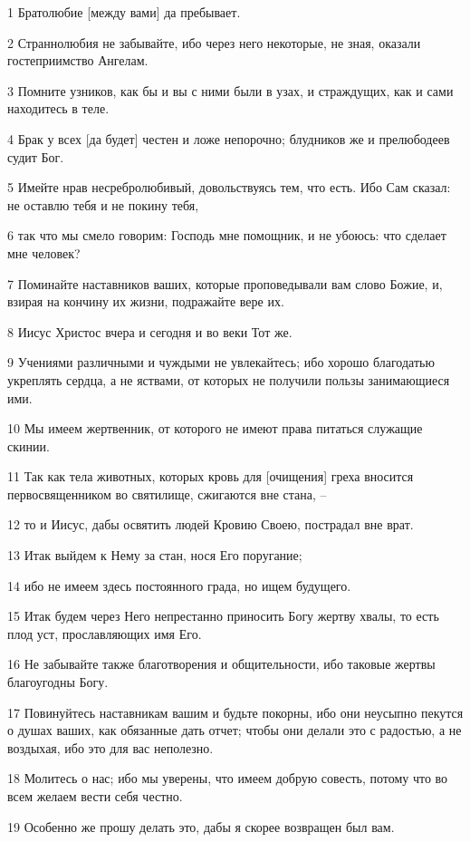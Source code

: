 \par 1 Братолюбие [между вами] да пребывает.
\par 2 Страннолюбия не забывайте, ибо через него некоторые, не зная, оказали гостеприимство Ангелам.
\par 3 Помните узников, как бы и вы с ними были в узах, и страждущих, как и сами находитесь в теле.
\par 4 Брак у всех [да будет] честен и ложе непорочно; блудников же и прелюбодеев судит Бог.
\par 5 Имейте нрав несребролюбивый, довольствуясь тем, что есть. Ибо Сам сказал: не оставлю тебя и не покину тебя,
\par 6 так что мы смело говорим: Господь мне помощник, и не убоюсь: что сделает мне человек?
\par 7 Поминайте наставников ваших, которые проповедывали вам слово Божие, и, взирая на кончину их жизни, подражайте вере их.
\par 8 Иисус Христос вчера и сегодня и во веки Тот же.
\par 9 Учениями различными и чуждыми не увлекайтесь; ибо хорошо благодатью укреплять сердца, а не яствами, от которых не получили пользы занимающиеся ими.
\par 10 Мы имеем жертвенник, от которого не имеют права питаться служащие скинии.
\par 11 Так как тела животных, которых кровь для [очищения] греха вносится первосвященником во святилище, сжигаются вне стана, --
\par 12 то и Иисус, дабы освятить людей Кровию Своею, пострадал вне врат.
\par 13 Итак выйдем к Нему за стан, нося Его поругание;
\par 14 ибо не имеем здесь постоянного града, но ищем будущего.
\par 15 Итак будем через Него непрестанно приносить Богу жертву хвалы, то есть плод уст, прославляющих имя Его.
\par 16 Не забывайте также благотворения и общительности, ибо таковые жертвы благоугодны Богу.
\par 17 Повинуйтесь наставникам вашим и будьте покорны, ибо они неусыпно пекутся о душах ваших, как обязанные дать отчет; чтобы они делали это с радостью, а не воздыхая, ибо это для вас неполезно.
\par 18 Молитесь о нас; ибо мы уверены, что имеем добрую совесть, потому что во всем желаем вести себя честно.
\par 19 Особенно же прошу делать это, дабы я скорее возвращен был вам.
